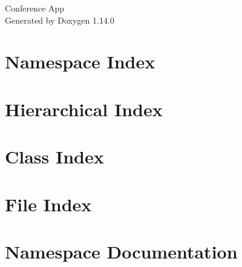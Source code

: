 \documentclass[twoside]{book}
\newcommand{\+}{\discretionary{\mbox{\scriptsize$\hookleftarrow$}}{}{}}
\newcommand{\clearemptydoublepage}{%
    \newpage{\pagestyle{empty}\cleardoublepage}%
  }
\begin{document}
  \raggedbottom
    \hypersetup{pageanchor=false,
                bookmarksnumbered=true,
                pdfencoding=unicode
               }
  \begin{titlepage}
  \vspace*{7cm}
  \begin{center}%
  {\Large Conference App}\\
  \vspace*{1cm}
  {\large Generated by Doxygen 1.14.0}\\
  \end{center}
  \end{titlepage}
  \clearemptydoublepage
  \tableofcontents
  \clearemptydoublepage
  \hypersetup{pageanchor=true}

\chapter{Namespace Index}

\chapter{Hierarchical Index}

\chapter{Class Index}

\chapter{File Index}

\chapter{Namespace Documentation}











\end{document}
